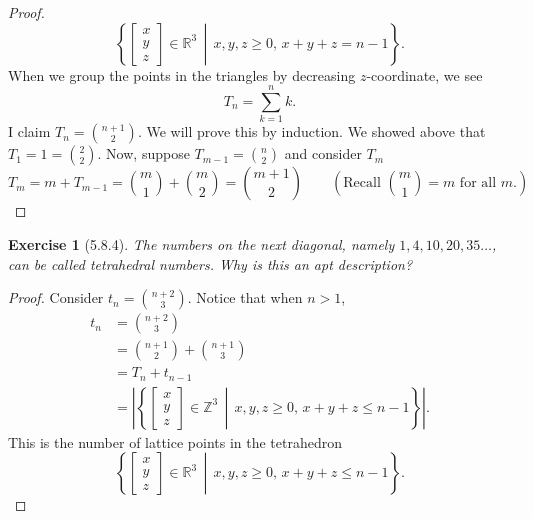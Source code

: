 \documentclass[12pt]{article}
\theoremstyle{plain}
\newtheorem{ex}{Exercise}
\begin{document}
\begin{proof}
  \[
    \left\{\begin{bmatrix}x\\y\\z\end{bmatrix}\in\mathbb{R}^3\,\middle|\,x,y,z\geq0,\,x+y+z=n-1\right\}.
  \]
  When we group the points in the triangles by decreasing $z$-coordinate, we see
  \[
    T_n=\sum_{k=1}^nk.
  \]
  I claim $T_n=\binom{n+1}{2}$. We will prove this by induction. We showed above that $\displaystyle T_1=1=\binom{2}{2}$. Now, suppose $\displaystyle T_{m-1}=\binom{n}{2}$ and consider $T_m$
  \[
    T_m=m+T_{m-1}=\binom{m}{1}+\binom{m}{2}=\binom{m+1}{2}\qquad\left(\text{Recall }\binom{m}{1}=m\text{ for all }m.\right)
  \]
\end{proof}

\begin{ex} [5.8.4]
  The numbers on the next diagonal, namely $1,4,10,20,35\ldots$, can be called \emph{tetrahedral numbers}. Why is this an apt description?
\end{ex}

\begin{proof}
  Consider $\displaystyle t_n=\binom{n+2}{3}$. Notice that when $n>1$,
  \begin{align*}
    t_n &= \binom{n+2}{3} \\
      &= \binom{n+1}{2}+\binom{n+1}{3} \\
      &= T_n+t_{n-1} \\
      &= \left|\left\{\begin{bmatrix}x\\y\\z\end{bmatrix}\in\mathbb{Z}^3\,\middle|\,x,y,z\geq0,\,x+y+z\leq n-1\right\}\right|.
  \end{align*}
  This is the number of lattice points in the tetrahedron
  \[
    \left\{\begin{bmatrix}x\\y\\z\end{bmatrix}\in\mathbb{R}^3\,\middle|\,x,y,z\geq0,\,x+y+z\leq n-1\right\}.
  \]
\end{proof}
\end{document}
